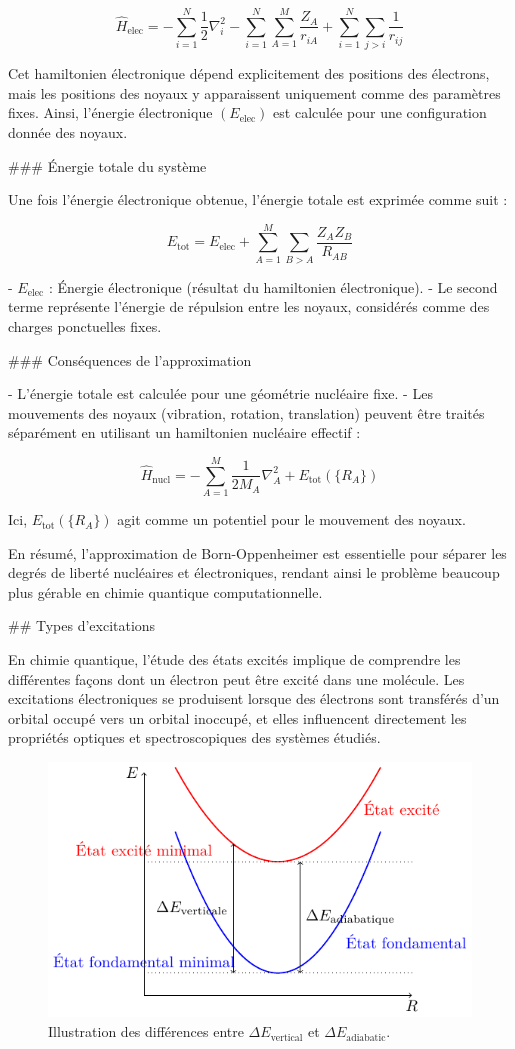 \documentclass[12pt,a4paper]{report}
\begin{document}
\begin{markdown}
\[
\hat{H}_{\text{elec}} = -\sum_{i=1}^N \frac{1}{2} \nabla_i^2 - \sum_{i=1}^N \sum_{A=1}^M \frac{Z_A}{r_{iA}} + \sum_{i=1}^N \sum_{j>i} \frac{1}{r_{ij}}
\]

Cet hamiltonien électronique dépend explicitement des positions des électrons, mais les positions des noyaux y apparaissent uniquement comme des paramètres fixes. Ainsi, l'énergie électronique \((E_{\text{elec}})\) est calculée pour une configuration donnée des noyaux.

### Énergie totale du système

Une fois l'énergie électronique obtenue, l'énergie totale est exprimée comme suit :

\[
E_{\text{tot}} = E_{\text{elec}} + \sum_{A=1}^M \sum_{B>A} \frac{Z_A Z_B}{R_{AB}}
\]

- \(E_{\text{elec}}\) : Énergie électronique (résultat du hamiltonien électronique).
- Le second terme représente l'énergie de répulsion entre les noyaux, considérés comme des charges ponctuelles fixes.

### Conséquences de l'approximation

- L'énergie totale est calculée pour une géométrie nucléaire fixe.
- Les mouvements des noyaux (vibration, rotation, translation) peuvent être traités séparément en utilisant un hamiltonien nucléaire effectif :

\[
\hat{H}_{\text{nucl}} = -\sum_{A=1}^M \frac{1}{2M_A} \nabla_A^2 + E_{\text{tot}}(\{R_A\})
\]

Ici, \(E_{\text{tot}}(\{R_A\})\) agit comme un potentiel pour le mouvement des noyaux.

En résumé, l'approximation de Born-Oppenheimer est essentielle pour séparer les degrés de liberté nucléaires et électroniques, rendant ainsi le problème beaucoup plus gérable en chimie quantique computationnelle.


## Types d'excitations

En chimie quantique, l'étude des états excités implique de comprendre les différentes façons dont un électron peut être excité dans une molécule. Les excitations électroniques se produisent lorsque des électrons sont transférés d'un orbital occupé vers un orbital inoccupé, et elles influencent directement les propriétés optiques et spectroscopiques des systèmes étudiés.

\begin{figure}[htpb]
\centering
\includegraphics[width=0.7\linewidth]{Graphics/Excited_states}
\caption{Illustration des différences entre \(\Delta E_{\text{vertical}}\) et \(\Delta E_{\text{adiabatic}}\).}
\label{fig:excitedstates}
\end{figure}


\end{markdown}
\end{document}
